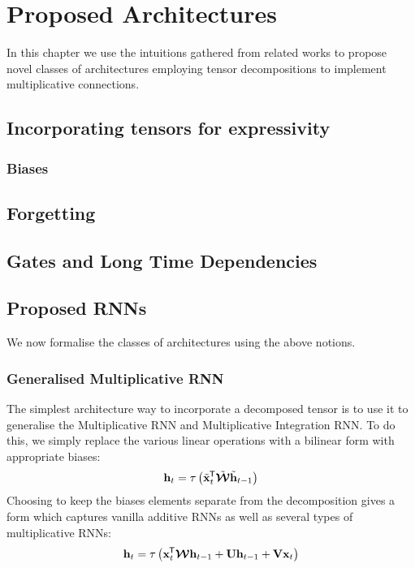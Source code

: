 
\chapter{Proposed Architectures}\label{C:arch}
In this chapter we use the intuitions gathered from related works to propose novel classes of
architectures employing tensor decompositions to implement multiplicative connections. 

\section{Incorporating tensors for expressivity}

\subsection{Biases}


\section{Forgetting}
\section{Gates and Long Time Dependencies}
\section{Proposed RNNs}
We now formalise the classes of architectures using the above notions.

\subsection{Generalised Multiplicative RNN}
The simplest architecture way to incorporate a decomposed tensor is to use it to generalise the
Multiplicative RNN and Multiplicative Integration RNN. \autocite{Martens2011a, Wu2016}
To do this, we simply replace the various linear operations with a bilinear form with appropriate
biases:
\begin{equation}\label{eq:gmrnn}
	\mathbf{h}_t = \tau\left( \tilde{\mathbf{x}}_t^{\mkern-1.5mu\mathsf{T}}\tilde{\bm{\mathcal{W}}}\tilde{\mathbf{h}}_{t-1} \right)
\end{equation}
Choosing to keep the biases elements separate from the decomposition gives a form which captures
vanilla additive RNNs as well as several types of multiplicative RNNs:
\begin{equation}\label{eq:gmrnnbias}
	\mathbf{h}_t = \tau\left(\mathbf{x}_t^{\mkern-1.5mu\mathsf{T}}\bm{\mathcal{W}}\mathbf{h}_{t-1}
		+ \mathbf{U}\mathbf{h}_{t-1} + \mathbf{V}\mathbf{x}_t\right)
\end{equation}